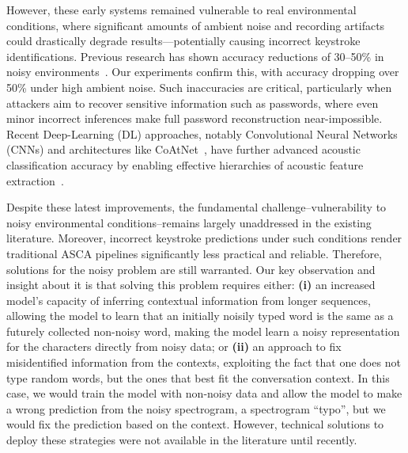 However, these early systems remained vulnerable to real environmental conditions, where significant amounts of ambient noise and recording artifacts could drastically degrade results—potentially causing incorrect keystroke identifications. Previous research has shown accuracy reductions of 30–50\% in noisy environments~\cite{halevi2012closer, harrison2023practical}. Our experiments confirm this, with accuracy dropping over 50\% under high ambient noise. Such inaccuracies are critical, particularly when attackers aim to recover sensitive information such as passwords, where even minor incorrect inferences make full password reconstruction near-impossible. Recent Deep-Learning (DL) approaches, notably Convolutional Neural Networks (CNNs) and architectures like CoAtNet~\cite{dai2021coatnet}, have further advanced acoustic classification accuracy by enabling effective hierarchies of acoustic feature extraction~\cite{harrison2023practical}. 

Despite these latest improvements, the fundamental challenge--vulnerability to noisy environmental conditions--remains largely unaddressed in the existing literature. Moreover, incorrect keystroke predictions under such conditions render traditional ASCA pipelines significantly less practical and reliable. Therefore, solutions for the noisy problem are still warranted. Our key observation and insight about it is that solving this problem requires either: \textbf{(i)} an increased model's capacity of inferring contextual information from longer sequences, allowing the model to learn that an initially noisily typed word is the same as a futurely collected non-noisy word, making the model learn a noisy representation for the characters directly from noisy data; or \textbf{(ii)} an approach to fix misidentified information from the contexts, exploiting the fact that one does not type random words, but the ones that best fit the conversation context. In this case, we would train the model with non-noisy data and allow the model to make a wrong prediction from the noisy spectrogram, a spectrogram ``typo'', but we would fix the prediction based on the context. However, technical solutions to deploy these strategies were not available in the literature until recently.

